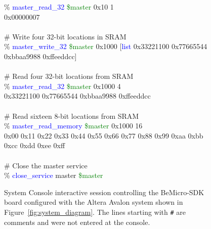 \documentclass[10pt,twoside]{article}
\begin{document}
\begin{figure}[p]
{\begin{minipage}{140mm}
\% \textcolor{blue}{master\_read\_32} \textcolor{green}{\$master} 0x10 1\\
0x00000007\\
\\
\# Write four 32-bit locations in SRAM\\
\% \textcolor{blue}{master\_write\_32} \textcolor{green}{\$master} 0x1000 [\textcolor{blue}{list} 0x33221100 0x77665544 0xbbaa9988 0xffeeddcc]\\
\\
\# Read four 32-bit locations from SRAM\\
\% \textcolor{blue}{master\_read\_32}  \textcolor{green}{\$master} 0x1000 4\\
0x33221100 0x77665544 0xbbaa9988 0xffeeddcc\\
\\
\# Read sixteen 8-bit locations from SRAM\\
\% \textcolor{blue}{master\_read\_memory}  \textcolor{green}{\$master} 0x1000 16\\
0x00 0x11 0x22 0x33 0x44 0x55 0x66 0x77 0x88 0x99 0xaa 0xbb 0xcc 0xdd 0xee 0xff\\
\\
\# Close the master service\\
\% \textcolor{blue}{close\_service} master \textcolor{green}{\$master}\\
\vspace{1mm}
\end{minipage}
}\hfil
\caption{System Console interactive session controlling the 
BeMicro-SDK board configured with the Altera Avalon system
shown in Figure~\ref{fig:system_diagram}. The lines starting 
with {\tt \#} are comments and were not entered at the console.}
\label{fig:system_console_interactive}
\end{figure}
\end{document}
